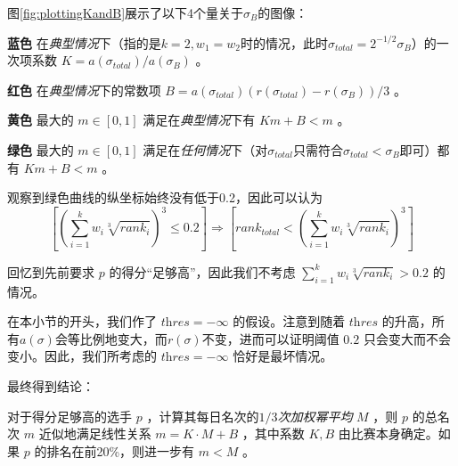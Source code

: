             图\ref{fig:plottingKandB}展示了以下4个量关于$\sigma_B$的图像：
            \begin{asparaitem}
                \vspace{1ex}
                \item [\textbf{蓝色}] 在\emph{典型情况}下（指的是$k=2,w_1=w_2$时的情况，此时$\sigma_{\textit{total}}=2^{-1/2}\sigma_B$）的一次项系数 $K=a(\sigma_{\textit{total}})/a(\sigma_B)$ 。
                \vspace{1ex}
                \item [\textbf{红色}] 在\emph{典型情况}下的常数项 $B=a(\sigma_{\textit{total}})\left(r(\sigma_{\textit{total}})-r(\sigma_B)\right)/3$ 。
                \vspace{1ex}
                \item [\textbf{黄色}] 最大的 $m\in [0,1]$ 满足在\emph{典型情况}下有 $Km+B<m$ 。
                \vspace{1ex}
                \item [\textbf{绿色}] 最大的 $m\in [0,1]$ 满足在\emph{任何情况}下（对$\sigma_{\textit{total}}$只需符合$\sigma_{\textit{total}}<\sigma_B$即可）都有 $Km+B<m$ 。
                \vspace{1ex}
            \end{asparaitem}

            观察到绿色曲线的纵坐标始终没有低于0.2，因此可以认为
            $$
            \left[\left(\sum\limits_{i=1}^k w_i\sqrt[3]{\textit{rank}_i}\right)^3\leq 0.2\right]\Rightarrow
            \left[\textit{rank}_{\textit{total}}<\left(\sum\limits_{i=1}^k w_i\sqrt[3]{\textit{rank}_i}\right)^3\right]
            $$

            回忆到先前要求 $p$ 的得分“足够高”，因此我们不考虑 $\sum_{i=1}^k w_i\sqrt[3]{\textit{rank}_i}>0.2$ 的情况。

            在本小节的开头，我们作了 $\textit{thres}=-\infty$ 的假设。注意到随着 $\textit{thres}$ 的升高，所有$a(\sigma)$会等比例地变大，而$r(\sigma)$不变，进而可以证明阈值 $0.2$ 只会变大而不会变小。因此，我们所考虑的 $\textit{thres}=-\infty$ 恰好是最坏情况。

            \vspace{1.5ex}

            最终得到结论：

            \begin{tcolorbox}[colback=white,colframe=black,boxrule=0.5pt,arc=0pt]
                对于得分足够高的选手 $p$ ，计算其每日名次的\emph{$1/3$次加权幂平均} $M$ ，则 $p$ 的总名次 $m$ 近似地满足线性关系 $m=K\cdot M+B$ ，其中系数 $K,B$ 由比赛本身确定。如果 $p$ 的排名在前20\%，则进一步有 $m<M$ 。
            \end{tcolorbox}

